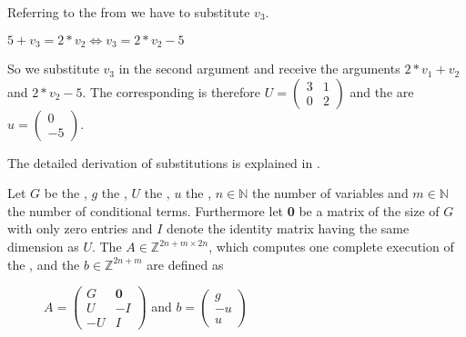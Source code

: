 \begin{example}
	\label{ex:updatematrix-and-constants}
	Referring to the \its from  we have to substitute $v_3$.
	\begin{center}
		$5+v_3=2*v_2 \Leftrightarrow v_3=2*v_2-5$
	\end{center}
	So we substitute $v_3$ in the second argument and receive the arguments $2*v_1+v_2$ and $2*v_2-5$.
	The corresponding \updatematrix is therefore $U = \begin{pmatrix} 3 & 1 \\ 0 & 2 \end{pmatrix}$ and the \updateconstants are $u = \begin{pmatrix} 0 \\ -5 \end{pmatrix}$.
	
	The detailed derivation of substitutions is explained in .
\end{example}

\begin{definition}
	\label{def:iteration}
	Let $G$ be the \guardmatrix, $g$ the \guardconstants, $U$ the \updatematrix, $u$ the \updateconstants, $n\in \mathbb{N}$ the number of variables and $m \in \mathbb{N}$ the number of conditional terms. \newline
	Furthermore let \textbf{0} be a matrix of the size of $G$ with only zero entries and $I$ denote the identity matrix having the same dimension as $U$. \newline
	The \iterationmatrix $A \in \mathbb{Z}^{2n+m \times 2n}$, which computes one complete execution of the \loopt, and the \iterationconstants $b\in \mathbb{Z}^{2n+m} $ are defined as
	\begin{figure}[H]
		\centering
		$A = \begin{pmatrix} G & \textbf{0} \\ U & -I \\ -U & I \end{pmatrix}$ and $b = \begin{pmatrix} g \\ -u \\ u \end{pmatrix}$ \cite{leike2014geometric}
	\end{figure}	
\end{definition}


